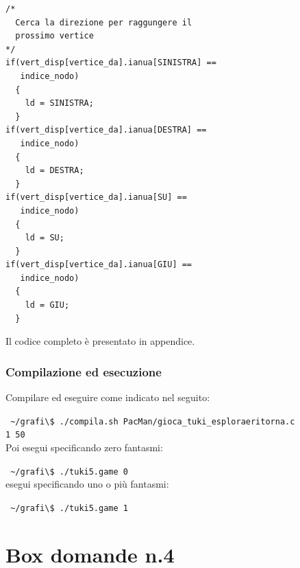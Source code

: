 \documentclass[8pt]{book}
\begin{document}
\begin{spacing}{0.9}
  \begin{small}
    \begin{tcolorbox}
\begin{verbatim}
/*
  Cerca la direzione per raggungere il 
  prossimo vertice
*/
if(vert_disp[vertice_da].ianua[SINISTRA] ==
   indice_nodo)
  {
    ld = SINISTRA;
  }
if(vert_disp[vertice_da].ianua[DESTRA] ==
   indice_nodo)
  {
    ld = DESTRA;
  }
if(vert_disp[vertice_da].ianua[SU] ==
   indice_nodo)
  {
    ld = SU;
  }
if(vert_disp[vertice_da].ianua[GIU] ==
   indice_nodo)
  {
    ld = GIU;
  }
\end{verbatim}
  \end{tcolorbox}
    \end{small}
      \end{spacing}

Il codice completo è presentato in appendice.

\subsubsection{Compilazione ed esecuzione}

Compilare ed eseguire come indicato nel seguito:

\texttt{
  \newline
\textasciitilde{}/grafi\textbackslash{}\$ ./compila.sh PacMan/gioca\_tuki\_esploraeritorna.c\\ 1 50
}\\

Poi esegui specificando zero fantasmi:

\texttt{
  \newline
  \textasciitilde{}/grafi\textbackslash{}\$ ./tuki5.game 0
  }\\

esegui specificando uno o più fantasmi:

\texttt{
  \newline
  \textasciitilde{}/grafi\textbackslash{}\$ ./tuki5.game 1
  }

\newpage
\section*{Box domande n.4}
\end{document}
